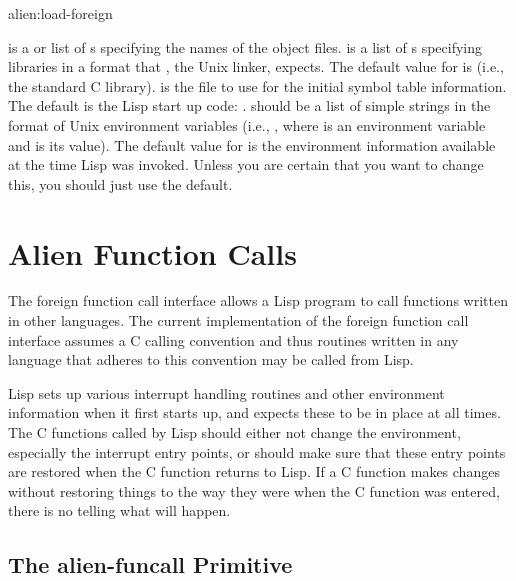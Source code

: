 \begin{defun}{alien:}{load-foreign}{%
    }
  
   is a  or list of
  s specifying the names of the object files.
   is a list of s specifying
  libraries in a format that , the Unix linker, expects.  The
  default value for  is  (i.e., the
  standard C library).   is the file to use for the
  initial symbol table information.  The default is the Lisp start up
  code: .   should be a list of simple
  strings in the format of Unix environment variables (i.e.,
  , where  is an environment variable and
   is its value).  The default value for  is the
  environment information available at the time Lisp was invoked.
  Unless you are certain that you want to change this, you should just
  use the default.
\end{defun}


\section{Alien Function Calls}

The foreign function call interface allows a Lisp program to call functions
written in other languages.  The current implementation of the foreign
function call interface assumes a C calling convention and thus routines
written in any language that adheres to this convention may be called from
Lisp.

Lisp sets up various interrupt handling routines and other environment
information when it first starts up, and expects these to be in place at all
times.  The C functions called by Lisp should either not change the
environment, especially the interrupt entry points, or should make sure
that these entry points are restored when the C function returns to Lisp.
If a C function makes changes without restoring things to the way they were
when the C function was entered, there is no telling what will happen.


\subsection{The alien-funcall Primitive}

